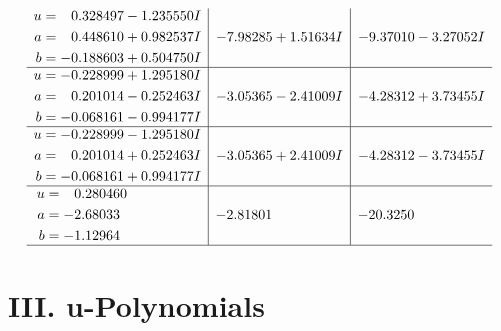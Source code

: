 \documentclass[1p]{elsarticle_modified}
\theoremstyle{definition}
\begin{document}
$$\begin{array}{c|c|c}
\begin{aligned}
u &= \phantom{-}0.328497 - 1.235550 I \\
a &= \phantom{-}0.448610 + 0.982537 I \\
b &= -0.188603 + 0.504750 I\end{aligned}
 & -7.98285 + 1.51634 I & -9.37010 - 3.27052 I \\ \hline\begin{aligned}
u &= -0.228999 + 1.295180 I \\
a &= \phantom{-}0.201014 - 0.252463 I \\
b &= -0.068161 - 0.994177 I\end{aligned}
 & -3.05365 - 2.41009 I & -4.28312 + 3.73455 I \\ \hline\begin{aligned}
u &= -0.228999 - 1.295180 I \\
a &= \phantom{-}0.201014 + 0.252463 I \\
b &= -0.068161 + 0.994177 I\end{aligned}
 & -3.05365 + 2.41009 I & -4.28312 - 3.73455 I \\ \hline\begin{aligned}
u &= \phantom{-}0.280460\phantom{ +0.000000I} \\
a &= -2.68033\phantom{ +0.000000I} \\
b &= -1.12964\phantom{ +0.000000I}\end{aligned}
 & -2.81801\phantom{ +0.000000I} & -20.3250\phantom{ +0.000000I}\\
 \hline 
 \end{array}$$\newpage
\newpage\renewcommand{\arraystretch}{1}
\centering \section*{ III. u-Polynomials}
\end{document}
